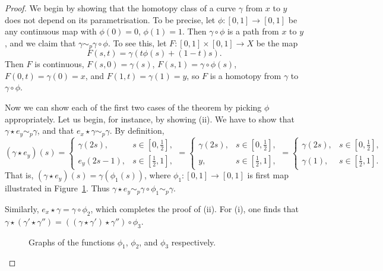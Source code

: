 \begin{proof}
  We begin by showing that the homotopy class of a curve $\gamma$ from $x$ to $y$ does not depend on its parametrisation. To be precise, let $\phi : [0,1] \to [0,1]$ be any continuous map with $\phi(0) = 0$, $\phi(1) = 1$. Then $\gamma \circ \phi$ is a path from $x$ to $y$, and we claim that $\gamma \sim_p \gamma \circ \phi$. To see this, let $F : [0,1] \times [0,1] \to X$ be the map
  \[
    F(s,t) = \gamma(t\phi(s) + (1-t)s).
  \]
  Then $F$ is continuous, $F(s,0) = \gamma(s)$, $F(s,1) = \gamma \circ \phi(s)$, $F(0,t) = \gamma(0) = x$, and $F(1,t) = \gamma(1) = y$, so $F$ is a homotopy from $\gamma$ to $\gamma \circ \phi$.
  
  Now we can show each of the first two cases of the theorem by picking $\phi$ appropriately. Let us begin, for instance, by showing (ii). We have to show that $\gamma \star e_y \sim_p \gamma$, and that $e_x \star \gamma \sim_p \gamma$. By definition,
  \[
    (\gamma \star e_y) (s) = \begin{cases} \gamma(2s), & s \in [0,\tfrac{1}{2}], \\ e_y(2s-1), & s \in [\tfrac{1}{2},1], \end{cases} = \begin{cases} \gamma(2s), & s \in [0,\tfrac{1}{2}], \\ y, & s \in [\tfrac{1}{2},1], \end{cases} = \begin{cases} \gamma(2s), & s \in [0,\tfrac{1}{2}], \\ \gamma(1), & s \in [\tfrac{1}{2},1]. \end{cases}
  \]
  That is, $(\gamma \star e_y)(s) = \gamma(\phi_1(s))$, where $\phi_1 : [0,1] \to [0,1]$ is first map illustrated in Figure~\ref{graph-reparametrisation}. Thus $\gamma \star e_y \sim_p \gamma \circ \phi_1 \sim_p \gamma$.
  
  Similarly, $e_x \star \gamma = \gamma \circ \phi_2$, which completes the proof of (ii). For (i), one finds that $\gamma \star (\gamma' \star \gamma'') = ((\gamma \star \gamma' ) \star \gamma'') \circ \phi_3$.
  \begin{figure}
    \centering
    \quad
    \quad
    \caption{Graphs of the functions $\phi_1$, $\phi_2$, and $\phi_3$ respectively.}
    \label{graph-reparametrisation}
  \end{figure}
  

\end{proof}
